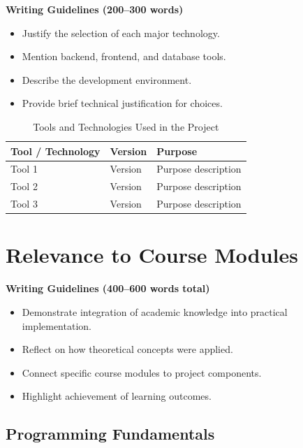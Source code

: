 \textbf{Writing Guidelines (200–300 words)}

\begin{itemize}
    \item Justify the selection of each major technology.
    \item Mention backend, frontend, and database tools.
    \item Describe the development environment.
    \item Provide brief technical justification for choices.
\end{itemize}
\begin{table}[h!]
\centering
\caption{Tools and Technologies Used in the Project}
\renewcommand{\arraystretch}{1.3}
\begin{tabularx}{\textwidth}{|p{4cm}|p{3cm}|X|}
\hline
\textbf{Tool / Technology} & \textbf{Version} & \textbf{Purpose} \\
\hline
Tool 1 & Version & Purpose description \\
Tool 2 & Version & Purpose description \\
Tool 3 & Version & Purpose description \\
\hline
\end{tabularx}
\end{table}





\section{Relevance to Course Modules}

\textbf{Writing Guidelines (400–600 words total)}

\begin{itemize}
    \item Demonstrate integration of academic knowledge into practical implementation.
    \item Reflect on how theoretical concepts were applied.
    \item Connect specific course modules to project components.
    \item Highlight achievement of learning outcomes.
\end{itemize}

\vspace{0.5cm}

\subsection{Programming Fundamentals}

